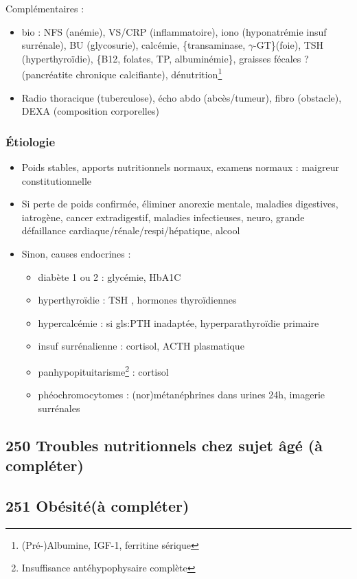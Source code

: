 \documentclass[11pt]{article}
\begin{document}
Complémentaires :
\begin{itemize}
\item bio : NFS (anémie), VS/CRP (inflammatoire), iono (hyponatrémie \thus insuf
surrénale), BU (glycosurie), calcémie, \{transaminase, \(\gamma\)-GT\}(foie), TSH
(hyperthyroïdie), \{B12, folates, TP, albuminémie\}, graisses fécales ?
(pancréatite chronique calcifiante), dénutrition\footnote{(Pré-)Albumine, IGF-1, ferritine sérique}
\item Radio thoracique (tuberculose), écho abdo (abcès/tumeur), fibro (obstacle),
DEXA (composition corporelles)
\end{itemize}

\subsubsection{Étiologie}
\label{sec:org9e2d8c8}
\begin{itemize}
\item Poids stables, apports nutritionnels normaux, examens normaux :  maigreur
constitutionnelle
\item Si perte de poids confirmée, éliminer anorexie mentale, maladies digestives,
iatrogène, cancer extradigestif, maladies infectieuses, neuro, grande
défaillance cardiaque/rénale/respi/hépatique, alcool
\item Sinon, causes endocrines :
\begin{itemize}
\item diabète 1 ou 2 : glycémie, HbA1C
\item hyperthyroïdie : TSH \dec\dec, hormones thyroïdiennes \inc
\item hypercalcémie : si gls:PTH inadaptée, hyperparathyroïdie primaire
\item insuf surrénalienne : cortisol, ACTH plasmatique
\item panhypopituitarisme\footnote{Insuffisance antéhypophysaire complète} : cortisol \dec
\item phéochromocytomes : (nor)métanéphrines dans urines 24h, imagerie surrénales
\end{itemize}
\end{itemize}
\subsection{250 \textdagger{} Troubles nutritionnels chez sujet âgé (à compléter)}
\label{sec:org14dbdbd}
\subsection{251 \textdagger{} Obésité(à compléter)}
\label{sec:org30adfc3}
\end{document}
